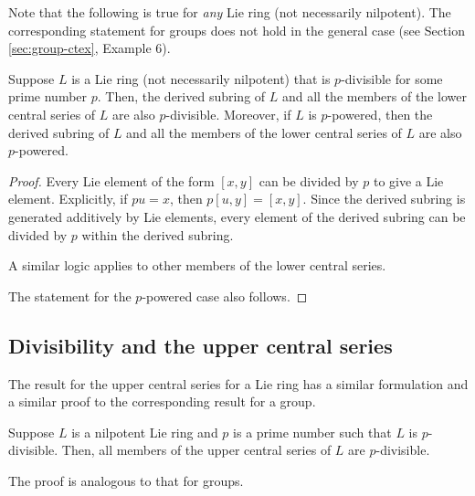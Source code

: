 \documentclass{ucetd}
\begin{document}
Note that the following is true for {\em any} Lie ring (not
necessarily nilpotent). The corresponding statement for groups does
not hold in the general case (see Section \ref{sec:group-ctex},
Example 6).

\begin{lemma}\label{lemma:lie-ring-lcs-divisibility}
  Suppose $L$ is a Lie ring (not necessarily nilpotent) that is
  $p$-divisible for some prime number $p$. Then, the derived subring
  of $L$ and all the members of the lower central series of $L$ are
  also $p$-divisible. Moreover, if $L$ is $p$-powered, then the
  derived subring of $L$ and all the members of the lower central
  series of $L$ are also $p$-powered.
\end{lemma}

\begin{proof}
  Every Lie element of the form $[x,y]$ can be divided by $p$ to give
  a Lie element. Explicitly, if $pu = x$, then $p[u,y] = [x,y]$. Since
  the derived subring is generated additively by Lie elements, every
  element of the derived subring can be divided by $p$ within the
  derived subring.

  A similar logic applies to other members of the lower central series.

  The statement for the $p$-powered case also follows.
\end{proof}

\subsection{Divisibility and the upper central series}

The result for the upper central series for a Lie ring has a similar
formulation and a similar proof to the corresponding result for a
group.

\begin{theorem}\label{thm:divisibility-upper-central-series-lie}
  Suppose $L$ is a nilpotent Lie ring and $p$ is a prime number such that
  $L$ is $p$-divisible. Then, all members of the upper central series
  of $L$ are $p$-divisible.
\end{theorem}

The proof is analogous to that for groups.
\end{document}
